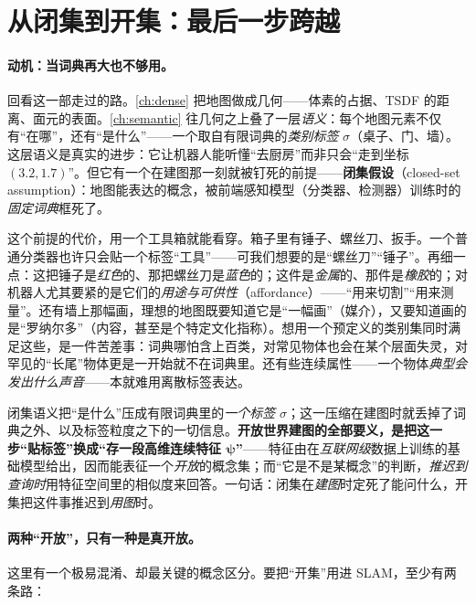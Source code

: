 \section{从闭集到开集：最后一步跨越}
\label{sec:openworld-closed-open}

\paragraph{动机：当词典再大也不够用。}
回看这一部走过的路。\cref{ch:dense} 把地图做成几何——体素的占据、TSDF 的距离、面元的表面。\cref{ch:semantic} 往几何之上叠了一层\emph{语义}：每个地图元素不仅有“在哪”，还有“是什么”——一个取自有限词典的\emph{类别标签} $\sigma$（桌子、门、墙）。这层语义是真实的进步：它让机器人能听懂“去厨房”而非只会“走到坐标 $(3.2,1.7)$”。但它有一个在建图那一刻就被钉死的前提——\textbf{闭集假设}（closed-set assumption）：地图能表达的概念，被前端感知模型（分类器、检测器）训练时的\emph{固定词典}框死了\cite{paull2026openworld}。

这个前提的代价，用一个工具箱就能看穿\cite{paull2026openworld}。箱子里有锤子、螺丝刀、扳手。一个普通分类器也许只会贴一个标签“工具”——可我们想要的是“螺丝刀”“锤子”。再细一点：这把锤子是\emph{红色}的、那把螺丝刀是\emph{蓝色}的；这件是\emph{金属}的、那件是\emph{橡胶}的；对机器人尤其要紧的是它们的\emph{用途与可供性}（affordance）——“用来切割”“用来测量”。还有墙上那幅画，理想的地图既要知道它是“一幅画”（媒介），又要知道画的是“罗纳尔多”（内容，甚至是个特定文化指称）。想用一个预定义的类别集同时满足这些，是一件苦差事：词典哪怕含上百类，对常见物体也会在某个层面失灵，对罕见的“长尾”物体更是一开始就不在词典里\cite{paull2026openworld}。还有些连续属性——一个物体\emph{典型会发出什么声音}——本就难用离散标签表达。

\begin{insight}
闭集语义把“是什么”压成有限词典里的\emph{一个标签} $\sigma$；这一压缩在建图时就丢掉了词典之外、以及标签粒度之下的一切信息。\textbf{开放世界建图的全部要义，是把这一步“贴标签”换成“存一段高维连续特征 $\boldsymbol\psi$”}——特征由在\emph{互联网级}数据上训练的基础模型给出，因而能表征一个\emph{开放}的概念集；而“它是不是某概念”的判断，\emph{推迟到查询时}用特征空间里的相似度来回答。一句话：闭集在\emph{建图}时定死了能问什么，开集把这件事推迟到\emph{用图}时。
\end{insight}

\paragraph{两种“开放”，只有一种是真开放。}
这里有一个极易混淆、却最关键的概念区分\cite{paull2026openworld}。要把“开集”用进 SLAM，至少有两条路：

